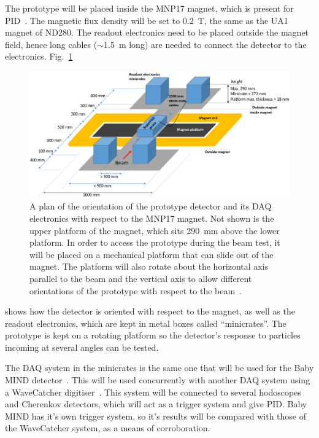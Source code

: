 \documentclass[aps,pra,12pt,notitlepage,tightenlines]{revtex4-1}
\begin{document}
The prototype will be placed inside the MNP17 magnet, which is present for PID~\cite{Brooks2015}. The magnetic flux density will be set to 0.2~T, the same as the UA1 magnet of ND280. The readout electronics need to be placed outside the magnet field, hence long cables ($\sim$1.5~m long) are needed to connect the detector to the electronics. Fig.\ \ref{fig:plat}
\begin{figure}
 \includegraphics[scale=0.4]{platform2}
 \caption{A plan of the orientation of the prototype detector and its DAQ electronics with respect to the MNP17 magnet. Not shown is the upper platform of the magnet, which sits 290~mm above the lower platform. In order to access the prototype during the beam test, it will be placed on a mechanical platform that can slide out of the magnet. The platform will also rotate about the horizontal axis parallel to the beam and the vertical axis to allow different orientations of the prototype with respect to the beam~\cite{Cadoux2018}.}
 \label{fig:plat}
\end{figure}
shows how the detector is oriented with respect to the magnet, as well as the readout electronics, which are kept in metal boxes called ``minicrates''. The prototype is kept on a rotating platform so the detector's response to particles incoming at several angles can be tested.

The DAQ system in the minicrates is the same one that will be used for the Baby MIND detector~\cite{Antonova2017}. This will be used concurrently with another DAQ system using a WaveCatcher digitiser~\cite{CAEN}. This system will be connected to several hodoscopes and Cherenkov detectors, which will act as a trigger system and give PID. Baby MIND has it's own trigger system, so it's results will be compared with those of the WaveCatcher system, as a means of corroboration.
\end{document}
